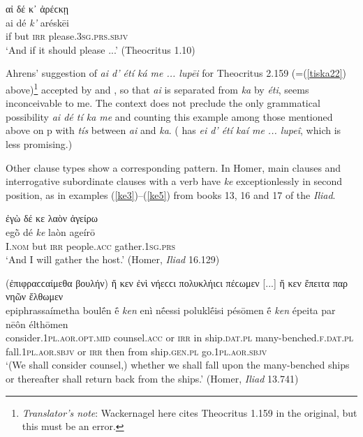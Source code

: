 \begin{exe}
\ex αἰ δέ κ᾽ ἀρέϲκῃ\\
\gll ai dé \emph{k'} aréskēi\\
if but \textsc{irr} please.\textsc{3sg.prs.sbjv}\\
\trans `And if it should please ...' (Theocritus 1.10)
\label{theocritus110}
\end{exe}

Ahrens' \citeyearpar[24]{Ahrens1855} suggestion of \textit{ai d' étí ká me ... lupēi} for Theocritus 2.159 (=(\ref{tiska22}) above)\label{Theocritus2159}\footnote{\emph{Translator's note}: Wackernagel here cites Theocritus 1.159 in the original, but this must be an error.} accepted by \citet[28, 213]{Meineke1856} and \citet[75]{FritzscheHiller1881}, so that \textit{ai} is separated from \textit{ka} by \textit{éti}, seems inconceivable to me. The context does not preclude the only grammatical possibility \textit{ai dé tí ka me} and counting this example among those mentioned above on p\pageref{aitiska} with \textit{tís} between \textit{ai} and \textit{ka}. (\citealp[12]{Hermann1817} has \textit{ei d' étí kaí me ... lupeî}, which is less promising.)

Other clause types show a corresponding pattern. In Homer, main clauses and interrogative subordinate clauses with a  verb have \textit{ke} exceptionlessly in second position, as in examples (\ref{ke3})--(\ref{ke5}) from books 13, 16 and 17 of the \textit{Iliad}. 

\begin{exe}
\ex ἐγὼ δέ κε λαὸν ἀγείρω\\
\gll egṑ dé \emph{ke} laòn ageírō\\
I.\textsc{nom} but \textsc{irr} people.\textsc{acc} gather.\textsc{1sg.prs}\\
\trans `And I will gather the host.' (Homer, \textit{Iliad} 16.129)
\label{ke3}
\end{exe}

\begin{exe}
\ex (ἐπιφραϲϲαίμεθα βουλήν) ἤ κεν ἐνὶ νήεϲϲι πολυκλήιϲι πέϲωμεν {[}...{]} ἤ κεν ἔπειτα παρ νηῶν ἔλθωμεν\\
\gll epiphrassaímetha boulḗn ḗ \emph{ken} enì nḗessi poluklḗisi pésōmen ḗ \emph{ken} épeita par nēôn élthōmen\\
consider.\textsc{1pl.aor.opt.mid} counsel.\textsc{acc} or \textsc{irr} in ship.\textsc{dat.pl} many-benched.\textsc{f.dat.pl} fall.\textsc{1pl.aor.sbjv} or
\textsc{irr} then from ship.\textsc{gen.pl} go.\textsc{1pl.aor.sbjv}\\
\trans `(We shall consider counsel,) whether we shall fall upon the many-benched ships or thereafter shall return back from the ships.' (Homer, \textit{Iliad} 13.741)
\label{ke4}
\end{exe}

